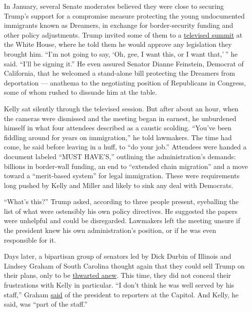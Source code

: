 In January, several Senate moderates believed they were close to
securing Trump's support for a compromise measure protecting the young
undocumented immigrants known as Dreamers, in exchange for
border-security funding and other policy adjustments. Trump invited some
of them to a
\href{https://www.nytimes3xbfgragh.onion/2018/01/09/us/politics/trump-immigration-meeting.html}{televised
summit} at the White House, where he told them he would approve any
legislation they brought him. ``I'm not going to say, `Oh, gee, I want
this, or I want that,' '' he said. ``I'll be signing it.'' He even
assured Senator Dianne Feinstein, Democrat of California, that he
welcomed a stand-alone bill protecting the Dreamers from deportation ---
anathema to the negotiating position of Republicans in Congress, some of
whom rushed to dissuade him at the table.

Kelly sat silently through the televised session. But after about an
hour, when the cameras were dismissed and the meeting began in earnest,
he unburdened himself in what four attendees described as a caustic
scolding. ``You've been fiddling around for years on immigration,'' he
told lawmakers. The time had come, he said before leaving in a huff, to
``do your job.'' Attendees were handed a document labeled ``MUST
HAVE'S,'' outlining the administration's demands: billions in
border-wall funding, an end to ``extended chain migration'' and a move
toward a ``merit-based system'' for legal immigration. These were
requirements long pushed by Kelly and Miller and likely to sink any deal
with Democrats.

``What's this?'' Trump asked, according to three people present,
eyeballing the list of what were ostensibly his own policy directives.
He suggested the papers were unhelpful and could be disregarded.
Lawmakers left the meeting unsure if the president knew his own
administration's position, or if he was even responsible for it.

Days later, a bipartisan group of senators led by Dick Durbin of
Illinois and Lindsey Graham of South Carolina thought again that they
could sell Trump on their plans, only to be
\href{https://www.nytimes3xbfgragh.onion/2018/01/19/us/politics/trump-durbin-immigration-daca.html}{thwarted
anew}. This time, they did not conceal their frustrations with Kelly in
particular. ``I don't think he was well served by his staff,'' Graham
\href{http://transcripts.cnn.com/TRANSCRIPTS/1801/16/sitroom.02.html}{said}
of the president to reporters at the Capitol. And Kelly, he said, was
``part of the staff.''

